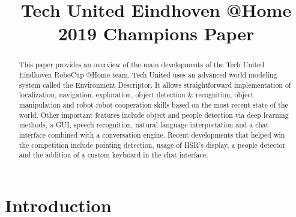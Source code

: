 \documentclass[runningheads,a4paper]{llncs}
\begin{document}

\title{Tech United Eindhoven @Home \\2019 Champions Paper}


\author{\color{red}{M.F.B.~van~der~Burgh , J.J.M.~Lunenburg, L.L.A.M.~van~Beek,
J.~Geijsberts, L.G.L.~Janssen, S.~Aleksandrov, K.~Dang,
H.W.A.M.~van~Rooy, A.T.~Hofkamp, D.~van~Dinther, A.~Aggarwal and M.J.G.~van~de~Molengraft}}




\maketitle
%
%
%
\begin{abstract}
This paper provides an overview of the main developments of the Tech United Eindhoven RoboCup @Home team. Tech United uses an advanced world modeling system called the Environment Descriptor. It allows straightforward implementation of localization, navigation, exploration, object detection \& recognition, object manipulation and robot-robot cooperation skills based on the most recent state of the world. Other important features include object and people detection via deep learning methods, a GUI, speech recognition, natural language interpretation and a chat interface combined with a conversation engine. Recent developments that helped win the competition include pointing detection, usage of HSR's display, a people detector and the addition of a custom keyboard in the chat interface.

\end{abstract}
%
%
%

\section{Introduction}

\end{document}
